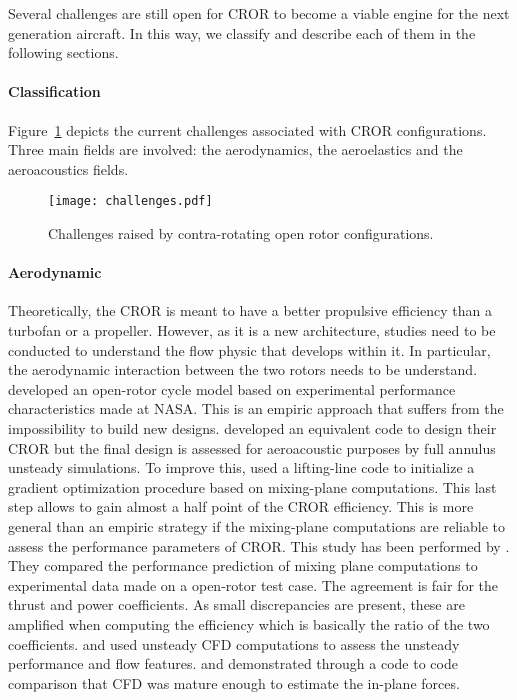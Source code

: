 
Several challenges are still open for CROR
to become a viable engine for the next generation aircraft.
In this way, we classify and describe each of them in the following sections.

\paragraph{Classification}
Figure~\ref{fig:cror_challenges} depicts the current challenges associated
with CROR configurations. Three main fields are involved: the aerodynamics, the
aeroelastics and the aeroacoustics fields.
\begin{figure}[htbp]
  \centering
  \texttt{[image: challenges.pdf]}
  \caption{Challenges raised by contra-rotating open rotor configurations.}
  \label{fig:cror_challenges}
\end{figure}

\paragraph{Aerodynamic}
Theoretically, 
the CROR is meant to have a better propulsive efficiency than a turbofan or a
propeller. However, as it is a new architecture, studies need to be conducted
to understand the flow physic that develops within it. In particular,
the aerodynamic interaction between the two rotors needs to be understand.
\citet{Hendricks2011} developed an open-rotor cycle model based
on experimental performance characteristics made at NASA. This is 
an empiric approach that suffers from the impossibility to build new designs.
\citet{Peters2012} developed an equivalent code to design their CROR but the
final design is assessed for aeroacoustic purposes by full annulus unsteady simulations.
To improve this, \citet{Bechet2011} used a lifting-line code to
initialize a gradient optimization procedure based on mixing-plane
computations. This last step allows to gain almost a half point of
the CROR efficiency. This is more general than an empiric strategy
if the mixing-plane computations are reliable to assess the performance
parameters of CROR. This study has been performed by \citet{Zachariadis2011}.
They compared the performance prediction of mixing plane computations
to experimental data made on a open-rotor test case.
The agreement is fair for the thrust and power coefficients.
As small discrepancies are present, these are amplified when computing
the efficiency which is basically the ratio of the two coefficients.
\citet{Vion2011} and \citet{Stuermer2008} used unsteady
CFD computations to assess the unsteady performance and flow features.
\citet{Stuermer2008} and \citet{Francois2013} demonstrated through a code to code comparison
that CFD was mature enough to estimate the in-plane forces.

